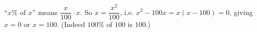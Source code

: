 ``$x\%$ of $x$'' means $\dfrac{x}{100}\cdot x$. So $x=\dfrac{x^2}{100}$, i.e. $x^2-100x=x(x-100)=0$, giving $\boxed{x=0\text{ or }x=100}$. (Indeed $100\%$ of $100$ is $100$.)
